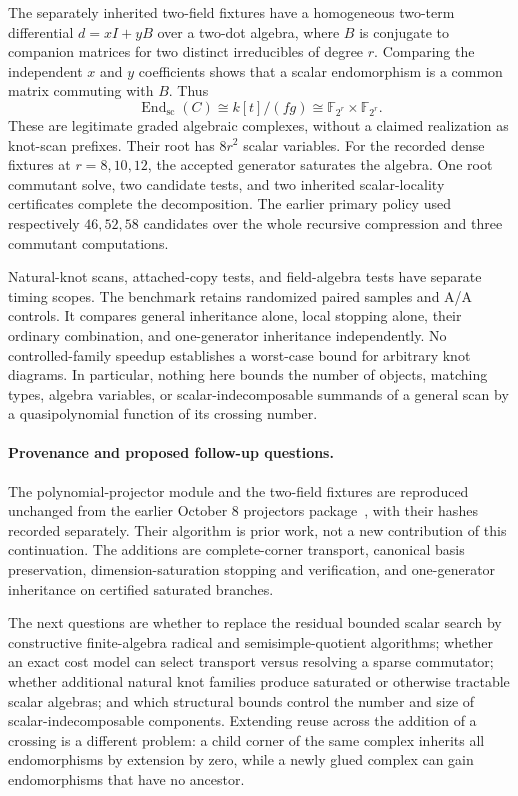 The separately inherited two-field fixtures have a homogeneous two-term
differential $d=xI+yB$ over a two-dot algebra, where $B$ is conjugate to
companion matrices for two distinct irreducibles of degree $r$. Comparing
the independent $x$ and $y$ coefficients shows that a scalar endomorphism
is a common matrix commuting with $B$. Thus
\[
 \operatorname{End}_{\mathrm{sc}}(C)
  \cong k[t]/(fg)\cong\mathbb F_{2^r}\times\mathbb F_{2^r}.
\]
These are legitimate graded algebraic complexes, without a claimed
realization as knot-scan prefixes. Their root has $8r^2$ scalar variables.
For the recorded dense fixtures at $r=8,10,12$, the accepted generator
saturates the algebra. One root commutant solve, two candidate tests, and
two inherited scalar-locality certificates complete the decomposition.
The earlier primary policy used respectively $46,52,58$ candidates over
the whole recursive compression and three commutant computations.

Natural-knot scans, attached-copy tests, and field-algebra tests have separate
timing scopes. The benchmark retains randomized paired samples and A/A
controls. It compares general inheritance alone, local stopping alone,
their ordinary combination, and one-generator inheritance independently.
No controlled-family speedup establishes a worst-case bound for arbitrary
knot diagrams. In particular, nothing here bounds the number of objects,
matching types, algebra variables, or scalar-indecomposable summands of a
general scan by a quasipolynomial function of its crossing number.

\paragraph{Provenance and proposed follow-up questions.}
The polynomial-projector module and the two-field fixtures are reproduced
unchanged from the earlier October 8 projectors package~\cite{projectors}, with their hashes
recorded separately. Their algorithm is prior work, not a new contribution
of this continuation. The additions are complete-corner transport,
canonical basis preservation, dimension-saturation stopping and verification,
and one-generator inheritance on certified saturated branches.

The next questions are whether to replace the residual bounded scalar search
by constructive finite-algebra radical and semisimple-quotient algorithms;
whether an exact cost model can select transport versus resolving a sparse
commutator; whether additional natural knot families produce saturated or
otherwise tractable scalar algebras; and which structural bounds control
the number and size of scalar-indecomposable components. Extending reuse
across the addition of a crossing is a different problem: a child corner
of the same complex inherits all endomorphisms by extension by zero, while
a newly glued complex can gain endomorphisms that have no ancestor.
